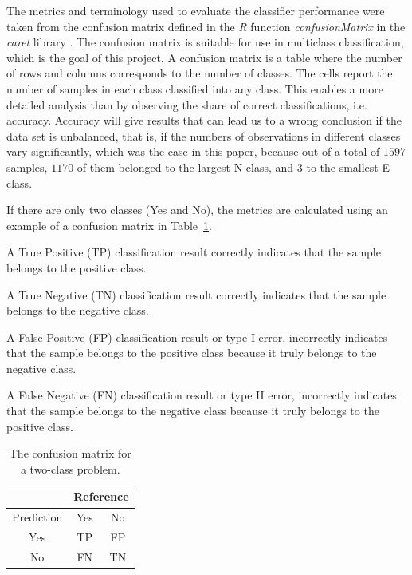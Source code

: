 \documentclass[sn-mathphys-num]{sn-jnl}%
\begin{document}
The metrics and terminology used to evaluate the classifier performance were taken from the confusion matrix defined in the \textit{R} function \textit{confusionMatrix} in the \textit{caret} library \cite{kuhn2008building, altman1994diagnostic1, altman1994diagnostic2, velez2007balanced, confusionMatrix2024}. The confusion matrix is suitable for use in multiclass classification, which is the goal of this project. A confusion matrix is a table where the number of rows and columns corresponds to the number of classes. The cells report the number of samples in each class classified into any class. This enables a more detailed analysis than by observing the share of correct classifications, i.e. accuracy. Accuracy will give results that can lead us to a wrong conclusion if the data set is unbalanced, that is, if the numbers of observations in different classes vary significantly, which was the case in this paper, because out of a total of $1597$ samples, $1170$ of them belonged to the largest N class, and $3$ to the smallest E class.

If there are only two classes (Yes and No), the metrics are calculated using an example of a confusion matrix in Table~\ref{tab:cm}.

A True Positive (TP) classification result correctly indicates that the sample belongs to the positive class.

A True Negative (TN) classification result correctly indicates that the sample belongs to the negative class.
 
A False Positive (FP) classification result or type I error, incorrectly indicates that the sample belongs to the positive class because it truly belongs to the negative class.

A False Negative (FN) classification result or type II error, incorrectly indicates that the sample belongs to the negative class because it truly belongs to the positive class.

\begin{table}[!ht]
    \centering
    \caption{The confusion matrix for a two-class problem.}
	\label{tab:cm}
	\begin{tabular}{|c|c|c|}
		\hline
		 & \multicolumn{2}{|c|}{Reference} \\ \hline
        Prediction & Yes & No \\ \hline
        Yes &TP & FP \\ \hline
        No & FN & TN \\ \hline
	\end{tabular}
\end{table}
\end{document}
